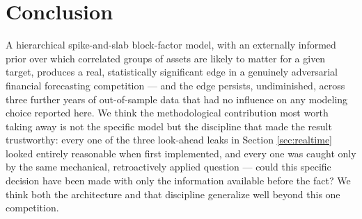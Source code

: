 \documentclass[11pt]{article}
\begin{document}
\section{Conclusion}
\label{sec:conclusion}

A hierarchical spike-and-slab block-factor model, with an externally
informed prior over which correlated groups of assets are likely to
matter for a given target, produces a real, statistically significant
edge in a genuinely adversarial financial forecasting competition ---
and the edge persists, undiminished, across three further years of
out-of-sample data that had no influence on any modeling choice reported
here. We think the methodological contribution most worth taking away is
not the specific model but the discipline that made the result
trustworthy: every one of the three look-ahead leaks in Section
\ref{sec:realtime} looked entirely reasonable when first implemented, and
every one was caught only by the same mechanical, retroactively applied
question --- could this specific decision have been made with only the
information available before the fact? We think both the architecture
and that discipline generalize well beyond this one competition.



\end{document}
